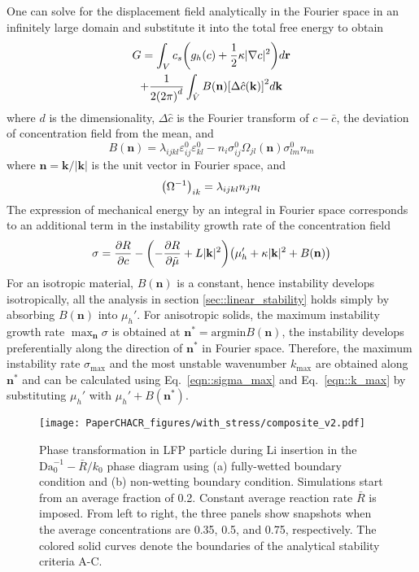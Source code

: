\documentclass[reprint,aps,pre,superscriptaddress]{revtex4-2}
\newcommand{\pderiv}[2]{\frac{\partial {#1}}{\partial {#2}}}
\let\originalleft\left
\let\originalright\right
\renewcommand{\left}{\mathopen{}\mathclose\bgroup\originalleft}
\renewcommand{\right}{\aftergroup\egroup\originalright}
\begin{document}
One can solve for the displacement field analytically in the Fourier space in an infinitely large domain \cite{khachaturyan2013theory,Cogswell2012} and substitute it into the total free energy to obtain
\begin{multline}
  G =  \int_V { c_s \left( g_h(c) + \frac{1}{2} \kappa | \nabla c|^2  \right)  d\mathbf{r}} \\ + \frac{1}{2 \left( 2 \pi \right)^d} \int_{\hat{V}}{ B(\mathbf{n}) \left[ \Delta \hat{c}(\mathbf{k}) \right]^2 d \mathbf{k}}
\end{multline}
where $d$ is the dimensionality, $\Delta\hat{c}$ is the Fourier transform of $c-\bar{c}$, the deviation of concentration field from the mean, and
\begin{equation}
  B(\mathbf{n}) = \lambda_{ijkl}\varepsilon_{ij}^0\varepsilon_{kl}^0 - n_i \sigma_{ij}^0 \Omega_{jl}(\mathbf{n}) \sigma_{lm}^0 n_m
\end{equation}
where $\mathbf{n} = \mathbf{k} /|\mathbf{k}|$ is the unit vector in Fourier space, and
\begin{equation}
  \left(\Omega^{-1}\right)_{ik} = \lambda_{ijkl}n_j n_l
\end{equation}
The expression of mechanical energy by an integral in Fourier space corresponds to an additional term in the instability growth rate of the concentration field
\begin{equation}
  \sigma = \pderiv{R}{c} - \left( -\pderiv{R}{\tilde{\mu}} + L |\mathbf{k}|^2 \right) \left( \mu_h' + \kappa |\mathbf{k}|^2 + B(\mathbf{n}) \right)
\end{equation}
For an isotropic material, $B(\mathbf{n})$ is a constant, hence instability develops isotropically, all the analysis in section \ref{sec::linear_stability} holds simply by absorbing $B(\mathbf{n})$ into $\mu_h'$. For anisotropic solids, the maximum instability growth rate $\max_\mathbf{n}{\sigma}$ is obtained at $\mathbf{n}^* = \text{argmin}B(\mathbf{n})$, the instability develops preferentially along the direction of $\mathbf{n}^*$ in Fourier space.
Therefore, the maximum instability rate $\sigma_\text{max}$ and the most unstable wavenumber $k_\text{max}$ are obtained along $\mathbf{n}^*$ and can be calculated using Eq.~\ref{eqn::sigma_max} and Eq.~\ref{eqn::k_max} by substituting $\mu_h'$ with $\mu_h' + B(\mathbf{n}^*)$.

\begin{figure*}
  \texttt{[image: PaperCHACR\_figures/with\_stress/composite\_v2.pdf]}
  \caption{Phase transformation in LFP particle during Li insertion in the $\text{Da}_0^{-1}-\bar{R}/k_0$ phase diagram using (a) fully-wetted boundary condition and (b) non-wetting boundary condition.  Simulations start from an average fraction of 0.2. Constant average reaction rate $\bar{R}$ is imposed. From left to right, the three panels show snapshots when the average concentrations are 0.35, 0.5, and 0.75, respectively. The colored solid curves denote the boundaries of the analytical stability criteria A-C.}
  \label{fig::with_stress}
\end{figure*}
\end{document}
